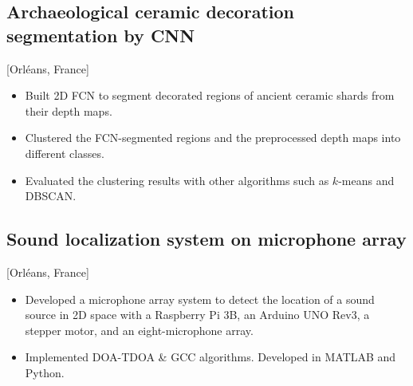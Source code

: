 \documentclass{mycv}
\begin{document}
\subsection{Archaeological ceramic decoration segmentation by CNN}[Orl\'eans, France]
\begin{positions}
\end{positions}

\begin{itemize}
    \item Built 2D FCN to segment decorated regions of ancient ceramic shards from their depth maps.
    \item Clustered the FCN-segmented regions and the preprocessed depth maps into different classes.
    \item Evaluated the clustering results with other algorithms such as $k$-means and DBSCAN.
\end{itemize}



\subsection{Sound localization system on microphone array}[Orl\'eans, France]
\begin{positions}
\end{positions}

\begin{itemize}
  \item Developed a microphone array system to detect the location of a sound source in 2D space with a Raspberry Pi 3B, an Arduino UNO Rev3, a stepper motor, and an eight-microphone array.
  \item Implemented DOA-TDOA \& GCC algorithms. Developed in MATLAB and Python.
\end{itemize}
\end{document}
